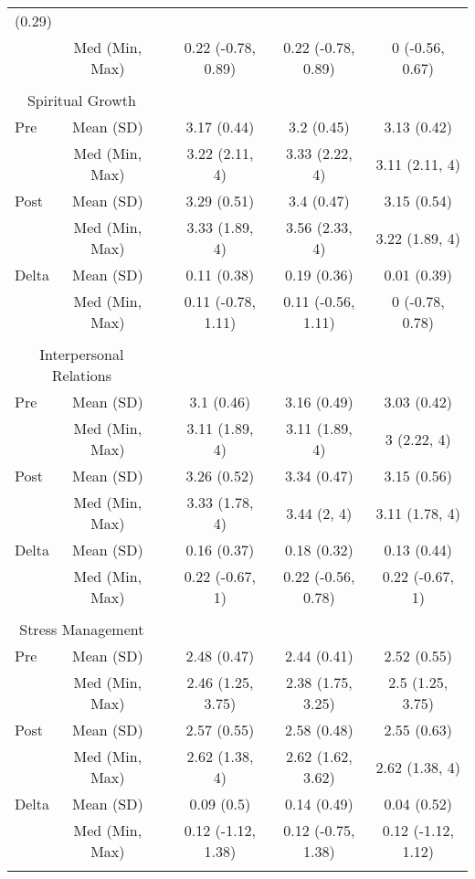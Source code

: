 \documentclass[]{article}
\begin{document}
\begin{table}[hbt]
\begin{tabular}{l c  p{0.001cm} | c c c }
(0.29) \\& Med (Min, Max) &  & 0.22 (-0.78, 0.89) & 0.22 (-0.78, 0.89) & 0 (-0.56, 0.67) \\&&\\\multicolumn{2}{c}{ Spiritual Growth } &&\\ Pre  & Mean (SD) &  & 3.17 (0.44) & 3.2 (0.45) & 3.13 (0.42) \\& Med (Min, Max) &  & 3.22 (2.11, 4) & 3.33 (2.22, 4) & 3.11 (2.11, 4) \\Post  & Mean (SD) &  & 3.29 (0.51) & 3.4 (0.47) & 3.15 (0.54) \\& Med (Min, Max) &  & 3.33 (1.89, 4) & 3.56 (2.33, 4) & 3.22 (1.89, 4) \\Delta  & Mean (SD) &  & 0.11 (0.38) & 0.19 (0.36) & 0.01 (0.39) \\& Med (Min, Max) &  & 0.11 (-0.78, 1.11) & 0.11 (-0.56, 1.11) & 0 (-0.78, 0.78) \\&&\\\multicolumn{2}{c}{ Interpersonal Relations } &&\\ Pre  & Mean (SD) &  & 3.1 (0.46) & 3.16 (0.49) & 3.03 (0.42) \\& Med (Min, Max) &  & 3.11 (1.89, 4) & 3.11 (1.89, 4) & 3 (2.22, 4) \\Post  & Mean (SD) &  & 3.26 (0.52) & 3.34 (0.47) & 3.15 (0.56) \\& Med (Min, Max) &  & 3.33 (1.78, 4) & 3.44 (2, 4) & 3.11 (1.78, 4) \\Delta  & Mean (SD) &  & 0.16 (0.37) & 0.18 (0.32) & 0.13 (0.44) \\& Med (Min, Max) &  & 0.22 (-0.67, 1) & 0.22 (-0.56, 0.78) & 0.22 (-0.67, 1) \\&&\\\multicolumn{2}{c}{ Stress Management } &&\\ Pre  & Mean (SD) &  & 2.48 (0.47) & 2.44 (0.41) & 2.52 (0.55) \\& Med (Min, Max) &  & 2.46 (1.25, 3.75) & 2.38 (1.75, 3.25) & 2.5 (1.25, 3.75) \\Post  & Mean (SD) &  & 2.57 (0.55) & 2.58 (0.48) & 2.55 (0.63) \\& Med (Min, Max) &  & 2.62 (1.38, 4) & 2.62 (1.62, 3.62) & 2.62 (1.38, 4) \\Delta  & Mean (SD) &  & 0.09 (0.5) & 0.14 (0.49) & 0.04 (0.52) \\& Med (Min, Max) &  & 0.12 (-1.12, 1.38) & 0.12 (-0.75, 1.38) & 0.12 (-1.12, 1.12) \\&&\\
\end{tabular}
    
\label{tab:score}
\end{table}
\end{document}
